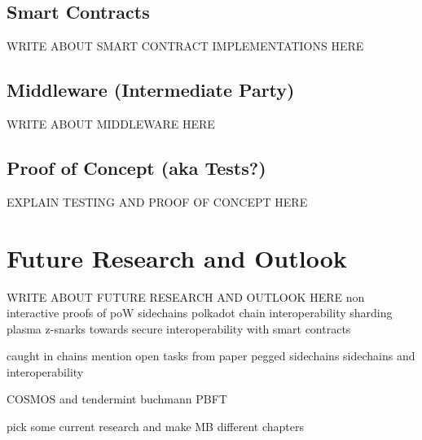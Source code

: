 \section{Smart Contracts}
\label{sec:chapter05:smartcontracts}
WRITE ABOUT SMART CONTRACT IMPLEMENTATIONS HERE

\section{Middleware (Intermediate Party)}
\label{sec:chapter05:middleware}
WRITE ABOUT MIDDLEWARE HERE

\section{Proof of Concept (aka Tests?)}
\label{sec:chapter05:poc}
EXPLAIN TESTING AND PROOF OF CONCEPT HERE

\chapter{Future Research and Outlook}
\label{ch:chapter06}

WRITE ABOUT FUTURE RESEARCH AND OUTLOOK HERE
non interactive proofs of poW \cite{kiayias2017non} sidechains \cite{kiayias2019proof} polkadot \cite{wood2016polkadot}  chain interoperability \cite{buterin2016chain} sharding \cite{buterin2017sharding} plasma \cite{poon2017plasma} z-snarks \cite{garoffolo2020zendoo} towards secure interoperability with smart contracts \cite{dagher2017towards}

caught in chains mention open tasks from paper \cite{borkowski2018caught}
pegged sidechains \cite{back2014enabling}
sidechains and interoperability \cite{johnson2019sidechains}


COSMOS \cite{kwon2018network} and tendermint \cite{kwon2014tendermint} buchmann \cite{buchman2016tendermint} PBFT \cite{castro1999practical}

pick some current research and make MB different chapters


